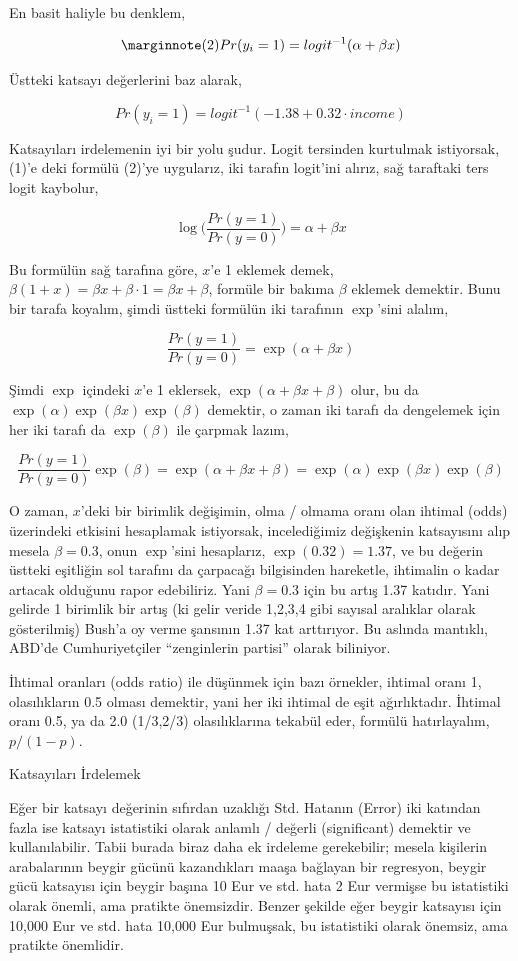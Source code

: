\documentclass[12pt,fleqn]{article}\usepackage{../../common}
\begin{document}
En basit haliyle bu denklem, 

$$ 
\mlabel{2}
Pr(y_i=1) = logit^{-1}(\alpha + \beta x)  $$

Üstteki katsayı değerlerini baz alarak, 

$$ Pr(y_i = 1) = logit^{-1}(-1.38 + 0.32 \cdot income) $$

Katsayıları irdelemenin iyi bir yolu şudur. Logit tersinden kurtulmak
istiyorsak, (1)'e deki formülü (2)'ye uygularız, iki tarafın logit'ini alırız,
sağ taraftaki ters logit kaybolur,

$$ \log \bigg( \frac{Pr(y=1)}{Pr(y=0)} \bigg) = \alpha + \beta x$$

Bu formülün sağ tarafına göre, $x$'e 1 eklemek demek, $\beta (1+x) = \beta x +
\beta \cdot 1 = \beta x + \beta$, formüle bir bakıma $\beta$ eklemek
demektir. Bunu bir tarafa koyalım, şimdi üstteki formülün iki tarafının
$\exp$'sini alalım,

$$ \frac{Pr(y=1)}{Pr(y=0)} = \exp(\alpha + \beta x)$$

Şimdi $\exp$ içindeki $x$'e 1 eklersek, $\exp(\alpha + \beta x + \beta)$ olur,
bu da $\exp(\alpha)\exp(\beta x ) \exp (\beta)$ demektir, o zaman iki tarafı da
dengelemek için her iki tarafı da $\exp(\beta)$ ile çarpmak lazım,

$$ 
\frac{Pr(y=1)}{Pr(y=0)}\exp(\beta) = \exp(\alpha + \beta x + \beta) = 
\exp(\alpha)\exp(\beta x ) \exp (\beta)
$$

O zaman, $x$'deki bir birimlik değişimin, olma / olmama oranı olan ihtimal
(odds) üzerindeki etkisini hesaplamak istiyorsak, incelediğimiz değişkenin
katsayısını alıp mesela $\beta = 0.3$, onun $\exp$'sini hesaplarız, $\exp(0.32)
= 1.37$, ve bu değerin üstteki eşitliğin sol tarafını da çarpacağı bilgisinden
hareketle, ihtimalin o kadar artacak olduğunu rapor edebiliriz. Yani $\beta =
0.3$ için bu artış 1.37 katıdır. Yani gelirde 1 birimlik bir artış (ki gelir
veride 1,2,3,4 gibi sayısal aralıklar olarak gösterilmiş) Bush'a oy verme
şansının 1.37 kat arttırıyor. Bu aslında mantıklı, ABD'de Cumhuriyetçiler
``zenginlerin partisi'' olarak biliniyor.

İhtimal oranları (odds ratio) ile düşünmek için bazı örnekler, ihtimal oranı 1,
olasılıkların 0.5 olması demektir, yani her iki ihtimal de eşit
ağırlıktadır. İhtimal oranı 0.5, ya da 2.0 (1/3,2/3) olasılıklarına tekabül
eder, formülü hatırlayalım, $p / (1-p)$.

Katsayıları İrdelemek

Eğer bir katsayı değerinin sıfırdan uzaklığı Std. Hatanın (Error) iki katından
fazla ise katsayı istatistiki olarak anlamlı / değerli (significant) demektir ve
kullanılabilir. Tabii burada biraz daha ek irdeleme gerekebilir; mesela
kişilerin arabalarının beygir gücünü kazandıkları maaşa bağlayan bir regresyon,
beygir gücü katsayısı için beygir başına 10 Eur ve std. hata 2 Eur vermişse bu
istatistiki olarak önemli, ama pratikte önemsizdir. Benzer şekilde eğer beygir
katsayısı için 10,000 Eur ve std. hata 10,000 Eur bulmuşsak, bu istatistiki
olarak önemsiz, ama pratikte önemlidir.
\end{document}
